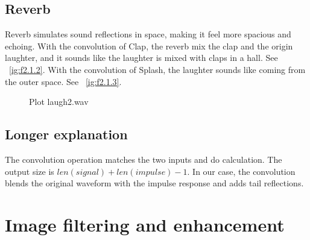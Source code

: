 \documentclass[12pt]{article}
\begin{document}
\subsection{Reverb}

Reverb simulates sound reflections in space, making it feel more spacious and echoing.
With the convolution of Clap, the reverb mix the clap and the origin laughter, and it sounds like the laughter is mixed with claps in a hall. See ~\ref{ig:f2.1.2}.
With the convolution of Splash, the laughter sounds like coming from the outer space.  See ~\ref{ig:f2.1.3}.


\begin{figure}[ht]
\centering
{}

\caption[]{Plot laugh2.wav}
\label{fig:2.1}
\end{figure}

\subsection{Longer explanation}

The convolution operation matches the two inputs and do calculation. The output size is $len(signal)+len(impulse)-1$. In our case, the convolution blends the original waveform with the impulse response and adds tail reflections.

\section{Image filtering and enhancement}
\end{document}
